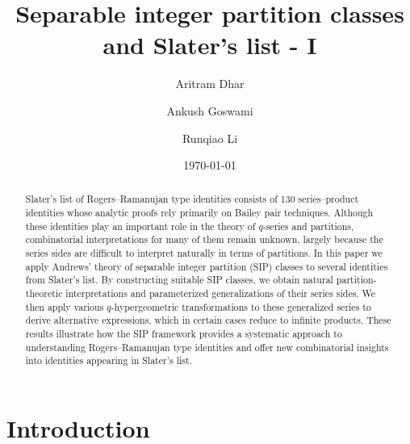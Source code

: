 \documentclass[12pt]{amsart}
\theoremstyle{definition}
\theoremstyle{remark}
\numberwithin{equation}{section}
\begin{document}
\title[Separable integer partition classes and Slater's list - I]{Separable integer partition classes and Slater's list - I}
\author{Aritram Dhar}
\address{Department of Mathematics, University of Florida, Gainesville,
FL 32611, USA}
\author{Ankush Goswami}
\address{Department of Mathematics, University of Texas Rio Grande Valley, Edinburg, TX 78541, USA}
\author{Runqiao Li}
\address{Department of Mathematics, University of Texas Rio Grande Valley, Edinburg, TX 78541, USA}

\date{\today}



\begin{abstract}
Slater’s list of Rogers--Ramanujan type identities consists of 130 series--product identities whose analytic proofs rely primarily on Bailey pair techniques. Although these identities play an important role in the theory of $q$-series and partitions, combinatorial interpretations for many of them remain unknown, largely because the series sides are difficult to interpret naturally in terms of partitions. In this paper we apply Andrews’ theory of separable integer partition (SIP) classes to several identities from Slater’s list. By constructing suitable SIP classes, we obtain natural partition-theoretic interpretations and parameterized generalizations of their series sides. We then apply various $q$-hypergeometric transformations to these generalized series to derive alternative expressions, which in certain cases reduce to infinite products. These results illustrate how the SIP framework provides a systematic approach to understanding Rogers--Ramanujan type identities and offer new combinatorial insights into identities appearing in Slater’s list.

\end{abstract}

\maketitle
\section{Introduction}
\end{document}
